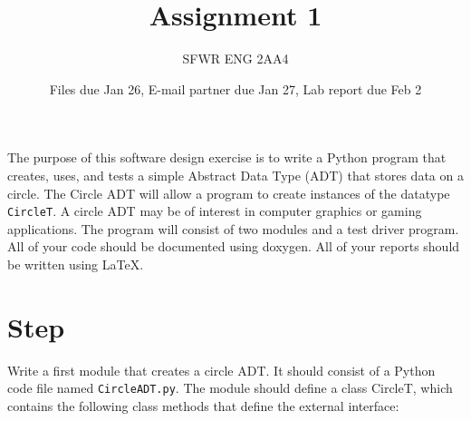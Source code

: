 \documentclass[12pt]{article}
\title{Assignment 1}
\author{SFWR ENG 2AA4}
\date{Files due Jan 26, E-mail partner due Jan 27, Lab report due Feb 2}
\newcounter{stepnum}
\begin{document}
\maketitle
The purpose of this software design exercise is to write a Python program that
creates, uses, and tests a simple Abstract Data Type (ADT) that stores data on a
circle.  The Circle ADT will allow a program to create instances of the datatype
{\tt CircleT}.  A circle ADT may be of interest in computer graphics or gaming
applications.  The program will consist of two modules and a test driver
program.
All of your code should be documented using doxygen.  All of your reports should
be written using LaTeX.
\section *{Step  \thestepnum}
Write a first module that creates a circle ADT.  It should consist of a Python code
file named {\tt CircleADT.py}.  The module should define a class CircleT, which
contains the following class methods that define the external interface:
\end{document}
